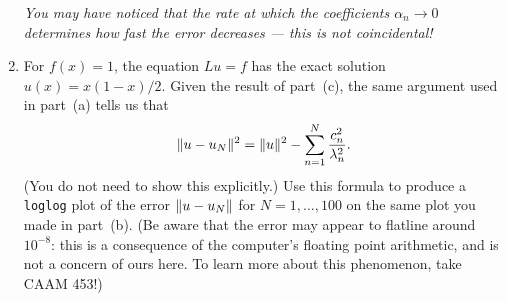 \begin{enumerate}
\emph{You may have noticed that the rate at which the coefficients $\alpha_n \rightarrow 0$ determines how fast the error decreases --- this is not coincidental!}  %

\item For $f(x) = 1$, the equation $Lu = f$ has the exact solution $u(x) = x(1-x)/2$.
%
 Given the result of part~(c), the same argument used in part~(a) tells us that 
      \[ \|u - u_N\|^{2} = \|u\|^2 - \sum_{n=1}^N {c_n^2 \over \lambda_n^2}.\]
      (You do not need to show this explicitly.)  Use this formula to produce a 
      \verb|loglog| plot of the error $\|u-u_N\|$ for $N=1,\ldots, 100$ 
      on the same plot you made in part~(b).  
      (Be aware that the error may appear to flatline 
      around $10^{-8}$: this is a consequence of the computer's floating point
      arithmetic, and is not a concern of ours here.  To learn more about this
      phenomenon, take CAAM 453!)

\end{enumerate}


